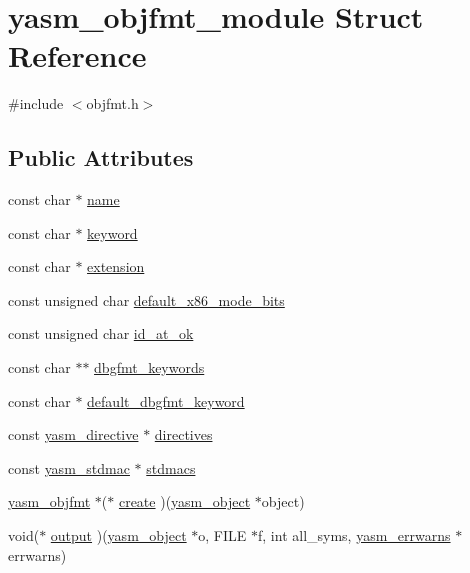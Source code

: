 \hypertarget{structyasm__objfmt__module}{\section{yasm\-\_\-objfmt\-\_\-module Struct Reference}
\label{structyasm__objfmt__module}
}


{\ttfamily \#include $<$objfmt.\-h$>$}

\subsection*{Public Attributes}
\begin{DoxyCompactItemize}
\item 
const char $\ast$ \hyperlink{structyasm__objfmt__module_a8680345e00c1f5f0141aa3d2b9e30b26}{name}
\item 
const char $\ast$ \hyperlink{structyasm__objfmt__module_a9e510cf4c0c7f848cf8c6d1b13f51036}{keyword}
\item 
const char $\ast$ \hyperlink{structyasm__objfmt__module_a9fb2337cdc2e80397d185f2e4e04b5ea}{extension}
\item 
const unsigned char \hyperlink{structyasm__objfmt__module_a3e301d11243b9378f5aedc4c92efba7c}{default\-\_\-x86\-\_\-mode\-\_\-bits}
\item 
const unsigned char \hyperlink{structyasm__objfmt__module_ae3e7c7b41312264be6a9d2ff01c668ec}{id\-\_\-at\-\_\-ok}
\item 
const char $\ast$$\ast$ \hyperlink{structyasm__objfmt__module_a1e349c3c4f8a09df4d45c41722065db7}{dbgfmt\-\_\-keywords}
\item 
const char $\ast$ \hyperlink{structyasm__objfmt__module_a922fb0423c14cd77aa56609224f3989c}{default\-\_\-dbgfmt\-\_\-keyword}
\item 
const \hyperlink{structyasm__directive}{yasm\-\_\-directive} $\ast$ \hyperlink{structyasm__objfmt__module_aad3cc13272a095a1c055704c80c66210}{directives}
\item 
const \hyperlink{structyasm__stdmac}{yasm\-\_\-stdmac} $\ast$ \hyperlink{structyasm__objfmt__module_a7786fbe1bf26e94e025f73422b4571ac}{stdmacs}
\item 
\hyperlink{coretype_8h_a391681636b57724e337bf97f9832adb7}{yasm\-\_\-objfmt} $\ast$($\ast$ \hyperlink{structyasm__objfmt__module_ab31b562cdf3e48eb10cf2ba407546ff3}{create} )(\hyperlink{structyasm__object}{yasm\-\_\-object} $\ast$object)
\item 
void($\ast$ \hyperlink{structyasm__objfmt__module_a5dbccfd2eba95930b2feff7a100c0fd4}{output} )(\hyperlink{structyasm__object}{yasm\-\_\-object} $\ast$o, F\-I\-L\-E $\ast$f, int all\-\_\-syms, \hyperlink{structyasm__errwarns}{yasm\-\_\-errwarns} $\ast$errwarns)
$$
\end{DoxyCompactItemize}
